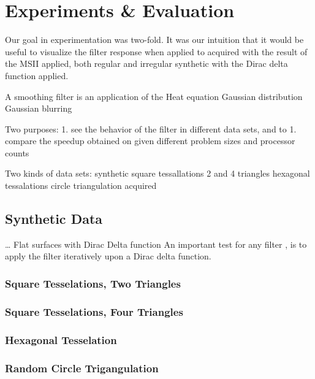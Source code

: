 \chapter{Experiments \& Evaluation}
Our goal in experimentation was two-fold. It was our intuition that it would be useful to visualize the filter response when applied to acquired \tdd{} with the result of the MSII applied, both regular and irregular synthetic \tdd{} with the Dirac delta function applied.

A smoothing filter is an application of the Heat equation 
Gaussian distribution
Gaussian blurring


Two purposes:
	1. see the behavior of the filter in different data sets, and to
	1. compare the speedup obtained on given different problem sizes and processor counts

Two kinds of data sets:
	synthetic
		square tessallations 2 and 4 triangles
		hexagonal tessalations
		circle triangulation
	acquired


%
%
%
%
%
%
\section{Synthetic Data}
\dots
Flat surfaces with Dirac Delta function
An important test for any filter\todoCitation{} , is to apply the filter iteratively upon a Dirac delta function\todoCitation{}.

%
%
%
%
\subsection{Square Tesselations, Two Triangles}
%

%
%
%
%
\subsection{Square Tesselations, Four Triangles}

%
%
%
%
\subsection{Hexagonal Tesselation}


%
%
%
%
\subsection{Random Circle Trigangulation}
%

